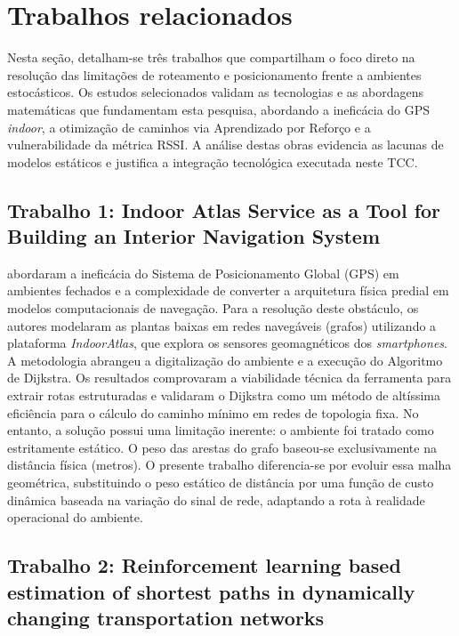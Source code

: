\documentclass[
    12pt,                %
    openright,           %
    oneside,             %
    a4paper,             %
    english,             %
    brazil               %
]{abntex2}
\begin{document}
\section{Trabalhos relacionados}
\label{sec:trabalhos_relacionados}

Nesta seção, detalham-se três trabalhos que compartilham o foco direto na resolução das limitações de roteamento e posicionamento frente a ambientes estocásticos. Os estudos selecionados validam as tecnologias e as abordagens matemáticas que fundamentam esta pesquisa, abordando a ineficácia do GPS \textit{indoor}, a otimização de caminhos via Aprendizado por Reforço e a vulnerabilidade da métrica RSSI. A análise destas obras evidencia as lacunas de modelos estáticos e justifica a integração tecnológica executada neste TCC.

\subsection{Trabalho 1: Indoor Atlas Service as a Tool for Building an Interior Navigation System}

 abordaram a ineficácia do Sistema de Posicionamento Global (GPS) em ambientes fechados e a complexidade de converter a arquitetura física predial em modelos computacionais de navegação. Para a resolução deste obstáculo, os autores modelaram as plantas baixas em redes navegáveis (grafos) utilizando a plataforma \textit{IndoorAtlas}, que explora os sensores geomagnéticos dos \textit{smartphones}. A metodologia abrangeu a digitalização do ambiente e a execução do Algoritmo de Dijkstra. Os resultados comprovaram a viabilidade técnica da ferramenta para extrair rotas estruturadas e validaram o Dijkstra como um método de altíssima eficiência para o cálculo do caminho mínimo em redes de topologia fixa. No entanto, a solução possui uma limitação inerente: o ambiente foi tratado como estritamente estático. O peso das arestas do grafo baseou-se exclusivamente na distância física (metros). O presente trabalho diferencia-se por evoluir essa malha geométrica, substituindo o peso estático de distância por uma função de custo dinâmica baseada na variação do sinal de rede, adaptando a rota à realidade operacional do ambiente.

\subsection{Trabalho 2: Reinforcement learning based estimation of shortest paths in dynamically changing transportation networks}
\end{document}
